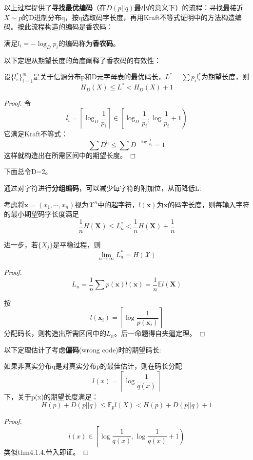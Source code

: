 \documentclass{ctexbook}
\begin{document}
以上过程提供了\textbf{寻找最优编码}（在$D(p||q)$最小的意义下）的流程：寻找最接近$X\sim p$的D进制分布q，按q选取码字长度，再用Kraft不等式证明中的方法构造编码。按此流程构造的编码是香农码：

\begin{definition}[香农码]
    满足$l_i=-\log_D p_i$的编码称为\textbf{香农码}。
\end{definition}

以下定理从期望长度的角度阐释了香农码的有效性：
\begin{theorem}
    设$\{l_i^*\}_{i=1}^{m}$是关于信源分布p和D元字母表的最优码长，$L^*=\sum p_i l_i^*$为期望长度，则
    \[H_D(X)\leq L^* <H_D(X)+1\]
\end{theorem}
\begin{proof}
    令
    $$l_i=\left\lceil \log_D\frac{1}{p_i}\right\rceil\in\left[\log_D\frac{1}{p_i},\log\frac{1}{p_i}+1\right)$$
    它满足Kraft不等式：
    \[\sum D^{l_i}\leq\sum D^{-\log\frac{1}{p_i}}=1\]
    这样就构造出在所需区间中的期望长度。
\end{proof}

下面总令D=2。

通过对字符进行\textbf{分组编码}，可以减少每字符的附加位，从而降低L:

\begin{theorem}
    考虑将$\mathbf{x}=(x_1,\cdots,x_n)$视为$\mathcal{X} ^n$中的超字符，$l(\mathbf{x})$为$\mathbf{x}$的码字长度，则每输入字符的最小期望码字长度满足
    \[\frac{1}{n}H(\mathbf{X})\leq L_n^*<\frac{1}{n}H(\mathbf{X})+\frac{1}{n}\]

    进一步，若$\{X_j\}$是平稳过程，则
    \[\lim_{n\to\infty}L^*_n=H(\mathcal{X} )\]
\end{theorem}
\begin{proof}
    \[L_n=\frac{1}{n}\sum p(\mathbf{x})l(\mathbf{x})=\frac{1}{n}\mathbb{E} l(\mathbf{X})\]

    按
    \[l(\mathbf{x}_i)=\left\lceil\log\frac{1}{p(\mathbf{x}_i)}\right\rceil\]
    分配码长，则构造出所需区间中的$L_n$。后一命题得自夹逼定理。
\end{proof}

以下定理估计了考虑\textbf{偏码}(wrong code)时的期望码长:
\begin{theorem}
    如果非真实分布q是对真实分布p的最佳估计，则在码长分配
    $$l(x)=\left\lceil\log\dfrac{1}{q(x)}\right\rceil$$
    下，关于p(x)的期望长度满足：
    \[H(p)+D(p||q)\leq\mathbb{E}_p l(X)<H(p)+D(p||q)+1\]
\end{theorem}
\begin{proof}
    \[l(x)\in\left[\log\frac{1}{q(x)},\log\frac{1}{q(x)}+1\right)\]
    类似thm4.1.4.带入即证。
\end{proof}
\end{document}
